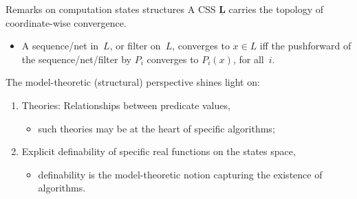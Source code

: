 \documentclass{beamer}
\begin{document}
\begin{frame}{Remarks on computation states structures}
 A CSS $\underline{\mathbf{L}}$ carries the \alert{topology of coordinate-wise convergence}.
 \begin{itemize}
 \item A sequence/net in~$L$, or filter on~$L$, converges to $x\in L$ iff the pushforward of the sequence/net/filter by $P_i$ converges to $P_i(x)$, for all~$i$.
 \end{itemize}


 The model-theoretic (structural) perspective shines light on:
 \begin{enumerate}
 \item \alert{Theories}: Relationships between predicate values,
   \begin{itemize}
   \item such theories may be at the heart of specific algorithms;
   \end{itemize}
 \item \alert{Explicit definability} of specific real functions on the states space,
   \begin{itemize}
   \item definability is the model-theoretic notion capturing the existence of algorithms.
   \end{itemize}
 \end{enumerate}
\end{frame}

\end{document}
